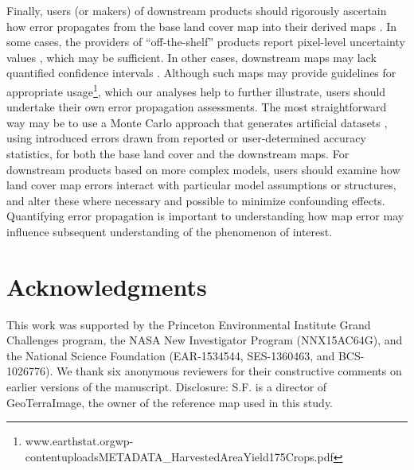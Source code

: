 \documentclass[12 pt, titlepage, a4paper]{article}
\begin{document}
Finally, users (or makers) of downstream products should rigorously ascertain how error propagates from the base land cover map into their derived maps \citep{verburg_challenges_2011}. In some cases, the providers of ``off-the-shelf'' products report pixel-level uncertainty values \citep[e.g.][]{ramankutty_farming_2008}, which may be sufficient.  In other cases, downstream maps may lack quantified confidence intervals \citep[e.g.][]{monfreda_farming_2008}. Although such maps may provide guidelines for appropriate usage\footnote{www.earthstat.org\/wp-content\/uploads\/METADATA\_HarvestedAreaYield175Crops.pdf}, which our analyses help to further illustrate, users should undertake their own error propagation assessments. The most straightforward way may be to use a Monte Carlo approach that generates artificial datasets \citep[e.g.][]{avelino_goldilocks_2016}, using introduced errors drawn from reported or user-determined accuracy statistics, for both the base land cover and the downstream maps. For downstream products based on more complex models, users should examine how land cover map errors interact with particular model assumptions or structures, and alter these where necessary and possible to minimize confounding effects. Quantifying error propagation is important to understanding how map error may influence subsequent understanding of the phenomenon of interest. 

\vspace{-0.3 cm}
\section*{Acknowledgments}
\vspace{-0.2 cm}
This work was supported by the Princeton Environmental Institute Grand Challenges program, the NASA New Investigator Program (NNX15AC64G), and the National Science Foundation (EAR-1534544, SES-1360463, and BCS-1026776). We thank six anonymous reviewers for their constructive comments on earlier versions of the manuscript. Disclosure: S.F. is a director of GeoTerraImage, the owner of the reference map used in this study. 

 
% 
{\footnotesize }

\end{document}
